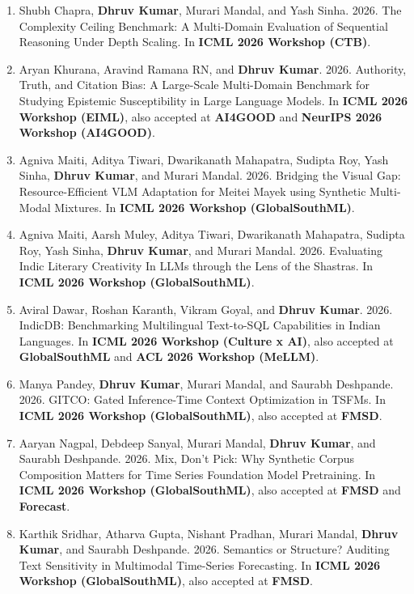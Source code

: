 \documentclass[10pt, a4paper]{article}
\begin{document}
\begin{enumerate}[label=\textbf{W\arabic*.}, leftmargin=2.8em, itemsep=0.3em]
\item Shubh Chapra, \textbf{Dhruv Kumar}, Murari Mandal, and Yash Sinha. 2026. The Complexity Ceiling Benchmark: A Multi-Domain Evaluation of Sequential Reasoning Under Depth Scaling. In \textbf{ICML 2026 Workshop (CTB)}.

\item Aryan Khurana, Aravind Ramana RN, and \textbf{Dhruv Kumar}. 2026. Authority, Truth, and Citation Bias: A Large-Scale Multi-Domain Benchmark for Studying Epistemic Susceptibility in Large Language Models. In \textbf{ICML 2026 Workshop (EIML)}, also accepted at \textbf{AI4GOOD} and \textbf{NeurIPS 2026 Workshop (AI4GOOD)}.

\item Agniva Maiti, Aditya Tiwari, Dwarikanath Mahapatra, Sudipta Roy, Yash Sinha, \textbf{Dhruv Kumar}, and Murari Mandal. 2026. Bridging the Visual Gap: Resource-Efficient VLM Adaptation for Meitei Mayek using Synthetic Multi-Modal Mixtures. In \textbf{ICML 2026 Workshop (GlobalSouthML)}.

\item Agniva Maiti, Aarsh Muley, Aditya Tiwari, Dwarikanath Mahapatra, Sudipta Roy, Yash Sinha, \textbf{Dhruv Kumar}, and Murari Mandal. 2026. Evaluating Indic Literary Creativity In LLMs through the Lens of the Shastras. In \textbf{ICML 2026 Workshop (GlobalSouthML)}.

\item Aviral Dawar, Roshan Karanth, Vikram Goyal, and \textbf{Dhruv Kumar}. 2026. IndicDB: Benchmarking Multilingual Text-to-SQL Capabilities in Indian Languages. In \textbf{ICML 2026 Workshop (Culture x AI)}, also accepted at \textbf{GlobalSouthML} and \textbf{ACL 2026 Workshop (MeLLM)}.

\item Manya Pandey, \textbf{Dhruv Kumar}, Murari Mandal, and Saurabh Deshpande. 2026. GITCO: Gated Inference-Time Context Optimization in TSFMs. In \textbf{ICML 2026 Workshop (GlobalSouthML)}, also accepted at \textbf{FMSD}.

\item Aaryan Nagpal, Debdeep Sanyal, Murari Mandal, \textbf{Dhruv Kumar}, and Saurabh Deshpande. 2026. Mix, Don't Pick: Why Synthetic Corpus Composition Matters for Time Series Foundation Model Pretraining. In \textbf{ICML 2026 Workshop (GlobalSouthML)}, also accepted at \textbf{FMSD} and \textbf{Forecast}.

\item Karthik Sridhar, Atharva Gupta, Nishant Pradhan, Murari Mandal, \textbf{Dhruv Kumar}, and Saurabh Deshpande. 2026. Semantics or Structure? Auditing Text Sensitivity in Multimodal Time-Series Forecasting. In \textbf{ICML 2026 Workshop (GlobalSouthML)}, also accepted at \textbf{FMSD}.


\end{enumerate}
\end{document}
